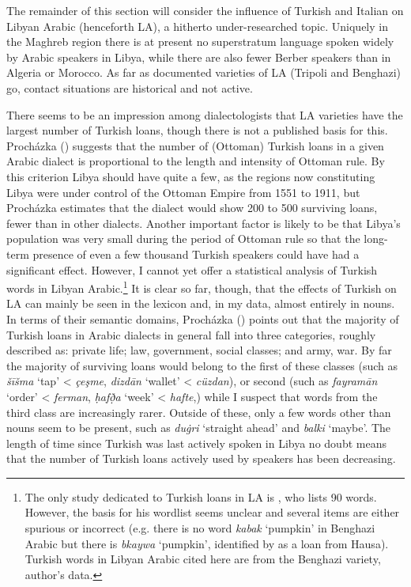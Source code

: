 \documentclass[output=paper]{langsci/langscibook}
\begin{document}
The remainder of this section will consider the influence of Turkish and Italian on Libyan Arabic (henceforth LA), a hitherto under-researched topic. Uniquely in the Maghreb region there is at present no superstratum language spoken widely by Arabic speakers in Libya, while there are also fewer Berber speakers than in Algeria or Morocco. As far as documented varieties of LA (Tripoli and Benghazi) go, contact situations are historical and not active.

  There seems to be an impression among dialectologists that LA varieties have the largest number of Turkish loans, though there is not a published basis for this. Procházka (\citeyear[191]{Procházka2005}) suggests that the number of (Ottoman) Turkish loans in a given Arabic dialect is proportional to the length and intensity of Ottoman rule. By this criterion Libya should have quite a few, as the regions now constituting Libya were under control of the Ottoman Empire from 1551 to 1911, but Procházka estimates that the dialect would show 200 to 500 surviving loans, fewer than in other dialects. Another important factor is likely to be that Libya’s population was very small during the period of Ottoman rule so that the long-term presence of even a few thousand Turkish speakers could have had a significant effect. However, I cannot yet offer a statistical analysis of Turkish words in Libyan Arabic.\footnote{The only study dedicated to Turkish loans in LA is \citet{Türkmen1988}, who lists 90 words. However, the basis for his wordlist seems unclear and  several items are either spurious or incorrect (e.g. there is no word \textit{kabak} ‘pumpkin’ in Benghazi Arabic but there is \textit{bkaywa} ‘pumpkin’, identified by \citet{Souag2013lexical} as a loan from Hausa). Turkish words in Libyan Arabic cited here are from the Benghazi variety, author’s data.} It is clear so far, though, that the effects of Turkish on LA can mainly be seen in the lexicon and, in my data, almost entirely in nouns. In terms of their semantic domains, Procházka (\citeyear[192]{Procházka2005}) points out that the majority of Turkish loans in Arabic dialects in general fall into three categories, roughly described as: private life; law, government, social classes; and army, war. By far the majority of surviving loans would belong to the first of these classes (such as \textit{šīšma} ‘tap’ < \textit{çeşme}, \textit{dizdān} ‘wallet’ < \textit{cüzdan}), or second (such as \textit{fayramān} ‘order’ < \textit{ferman}, \textit{ḥafð̣a} ‘week’ < \textit{hafte},) while I suspect that words from the third class are increasingly rarer. Outside of these, only a few words other than nouns seem to be present, such as \textit{du\.gri} ‘straight ahead’ and \textit{balki} ‘maybe’. The length of time since Turkish was last actively spoken in Libya no doubt means that the number of Turkish loans actively used by speakers has been decreasing.
\end{document}
